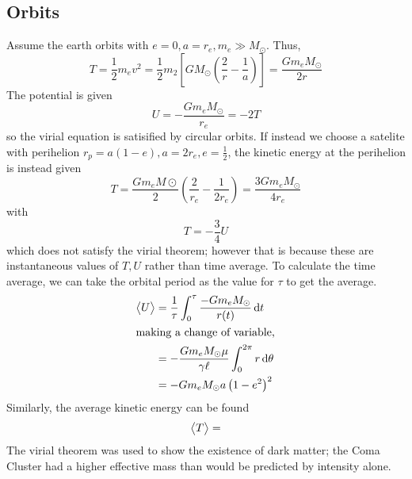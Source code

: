 \subsection{Orbits}
Assume the earth orbits with \(e=0, a=r_e, m_e\gg M_\odot\). Thus,
\[T=\frac{1}{2}m_ev^2 = \frac{1}{2}m_2\left[GM_\odot\left(\frac{2}{r}-\frac{1}{a}\right)\right]=\frac{Gm_eM_\odot}{2r}\]
The potential is given
\[U=-\frac{Gm_eM_\odot}{r_e} = -2T\]
so the virial equation is satisified by circular orbits. If instead we choose a satelite with perihelion \(r_p=a(1-e),a=2r_e,e=\frac{1}{2}\), the kinetic energy at the perihelion is instead given
\[T=\frac{Gm_eM\odot}{2}\left(\frac{2}{r_e}-\frac{1}{2r_e}\right)=\frac{3Gm_eM_\odot}{4r_e}\]
with 
\[T=-\frac{3}{4}U\]
which does not satisfy the virial theorem; however that is because these are instantaneous values of \(T,U\) rather than time average. To calculate the time average, we can take the orbital period as the value for \(\tau\) to get the average.
\begin{align*}
	\vect{U} &= \frac{1}{\tau}\int_0^\tau \frac{-Gm_eM_\odot}{r(t)}\d{t}\\
	\intertext{making a change of variable,}
		 &=-\frac{Gm_eM_\odot\mu}{\gamma \ell}\int_0^{2\pi}r\d\theta\\
		 &=-Gm_eM_\odot a \left(1-e^2\right)^2
\end{align*}
Similarly, the average kinetic energy can be found
\[\left\langle \begin{matrix}T\end{matrix} \right\rangle=\]
The virial theorem was used to show the existence of dark matter; the Coma Cluster had a higher effective mass than would be predicted by intensity alone.
